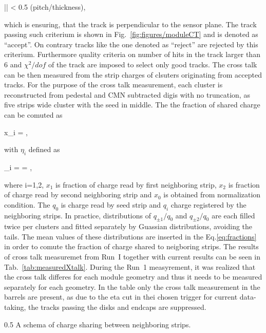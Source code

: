 {
|\theta {}\phi| < 0.5 \times (pitch/thickness),
}

which is ensuring, that the track is perpendicular to the sensor plane. The track passing such criterium is shown in Fig.~\ref{fig:figures/moduleCT} and is denoted as ``accept''. On contrary tracks like the one denoted as ``reject'' are rejected by this criterium. Furthermore quality criteria on number of hits in the track larger than 6 and $\chi^{2}/dof$ of the track are imposed to select only good tracks. The cross talk can be then measured from the strip charges of clsuters originating from accepted tracks. For the purpose of the cross talk measurement, each cluster is reconstructed from pedestal and CMN subtracted digis with no truncation, as five strips wide cluster with the seed in middle. The the fraction of shared charge can be comuted as


{
x_{i} =  ,
}

with $\eta_{i}$ defined as

{
\eta_{i} =  =  ,
}

where i=1,2, $x_{1}$ is fraction of charge read by first neighboring strip,  $x_{2}$ is fraction of charge read by second neighboring strip and $x_{0}$ is obtained from normalization condition. The $q_{0}$ is charge read by seed strip and $q_{i}$ charge registered by the neighboring strips. In practice, distributions of $q_{\pm 1}/q_{0}$ and $q_{\pm 2}/q_{0}$ are each filled twice per clusters and  fitted separately by Guassian distributions, avoiding the tails. The mean values of these distributions are inserted in the Eq.\ref{eq:fractions} in order to comute the fraction of charge shared to neigboring strips. The results of cross talk measuremet from Run~I together with current results can be seen in Tab.~\ref{tab:measuredXtalk}. During the Run~1 measyrement, it was realized that the cross talk differes for each module geometry and thus it needs to be measured separately for each geometry. In the table only the cross talk measurement in the barrels are present, as due to the eta cut in thei chosen trigger for current data-taking, the tracks passing the disks and endcaps are suppressed. 

                 {0.5}       %
                 { A schema of charge sharing between neighboring strips. }

